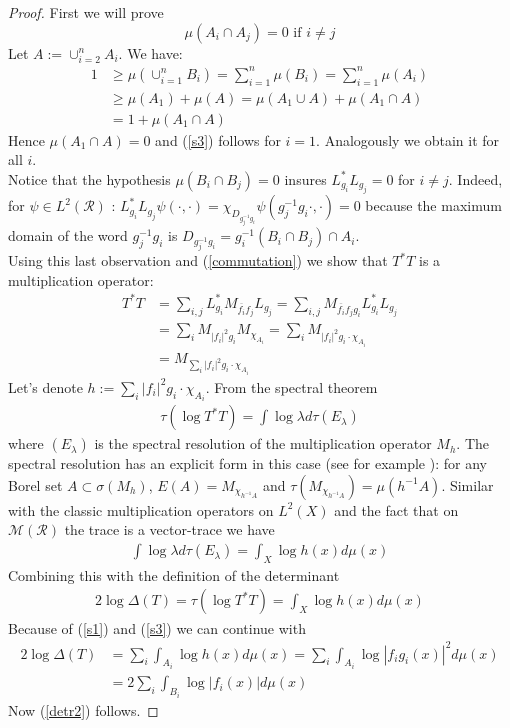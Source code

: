 \documentclass[12pt]{amsart}
\numberwithin{equation}{section}
\begin{document}
\begin{proof}
First we will prove
\begin{equation}\label{s3}
\mu(A_i\cap A_j)=0\mbox{  if  }i\neq j
\end{equation}
Let $A:=\cup_{i=2}^nA_i$. We have:
\begin{align*}
1&\geqslant\mu(\cup_{i=1}^nB_i)=\sum_{i=1}^n\mu(B_i)=\sum_{i=1}^n\mu(A_i)\\
&\geqslant\mu(A_1)+\mu(A)=\mu(A_1\cup A)+\mu(A_1\cap A)\\
&=1+\mu(A_1\cap A)
\end{align*}
Hence $\mu(A_1\cap A)=0$ and (\ref{s3}) follows for $i=1$. Analogously we obtain it for all $i$. \\
Notice that the hypothesis $\mu(B_i\cap B_j)=0$ insures  $L_{g_i}^*L_{g_j}=0$ for $i\neq j$. Indeed, for $\psi\in L^2(\mathcal{R})$ :
$L_{g_i}^*L_{g_j}\psi(\cdot,\cdot)=\chi_{D_{g_j^{-1}g_i}}\psi(g_j^{-1}g_i\cdot,\cdot)=0$ because the  maximum domain of the word $g_j^{-1}g_i$ is  $D_{g_j^{-1}g_i}=g_i^{-1}(B_i\cap B_j)\cap A_i$. \\
Using this last observation and (\ref{commutation}) we show that $T^*T$ is a multiplication operator:\\
\begin{align*}
T^*T &=\sum_{i,j}L_{g_i}^*M_{\overline{f_i}f_j}L_{g_j}=\sum_{i,j}M_{\overline{f_i}f_jg_i}L_{g_i}^*L_{g_j}\\
&=\sum_iM_{|f_i|^2g_i}M_{\chi_{A_i}}=\sum_iM_{|f_i|^2g_i\cdot\chi_{A_i}}\\
&=M_{\sum_i |f_i|^2g_i\cdot\chi_{A_i}}
\end{align*}
Let's denote $h:=\sum_i |f_i|^2g_i\cdot\chi_{A_i}$. From the spectral theorem
\begin{align*}
\tau(\log{T^*T})=\int\log\lambda d\tau(E_{\lambda})
\end{align*}
where $(E_{\lambda})$ is the spectral resolution of the multiplication operator $M_h$. The spectral resolution has an explicit form in this case (see for example \cite{Co}): for any Borel set $A\subset\sigma(M_h)$, $E(A)=M_{\chi_{ h^{-1}A}}$ and $\tau(M_{\chi_{ h^{-1}A}})=\mu(h^{-1}A)$. Similar with the classic multiplication operators on $L^2(X)$ and the fact that on $\mathcal{M(R)}$ the trace is a vector-trace
we have
\begin{align*}
\int\log\lambda d\tau(E_{\lambda})=\int_X\log h(x)d\mu(x)
\end{align*}
Combining this with the definition of the determinant
\begin{align*}
2\log\Delta (T) = \tau(\log{T^*T})=\int_X\log h(x)d\mu(x)
\end{align*}
Because of (\ref{s1}) and (\ref{s3}) we can continue with
\begin{align*}
2\log\Delta (T) &= \sum_i\int_{A_i}\log h(x)d\mu(x)=\sum_i\int_{A_i}\log |f_ig_i(x)|^2d\mu(x)\\&=2\sum_i\int_{B_i}\log |f_i(x)|d\mu(x)
\end{align*}
Now (\ref{detr2}) follows.
\end{proof}
\end{document}
